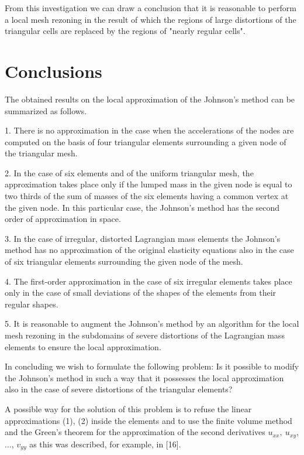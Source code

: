    From this investigation we can draw a conclusion that it is reasonable to
perform a local mesh rezoning in the result of which the regions of large
distortions of the triangular cells are replaced by the regions of "nearly
regular cells".


\section{Conclusions}
\hspace{6mm}
   The obtained results on the local approximation of the Johnson's method
can be summarized as follows.

 1. There is no approximation in the case when the accelerations of the nodes
are computed on the basis of four triangular elements surrounding a given
node of the triangular mesh.

  2. In the case of six elements and of the uniform triangular mesh, the
approximation takes place only if the lumped mass in the given node is equal
to two thirds of the sum of masses of the six elements having a common vertex
at the given node. In this particular case, the Johnson's method has the
second order of approximation in space.

  3. In the case of irregular, distorted Lagrangian mass elements the
Johnson's method has no approximation of the original elasticity equations also
in the case of six triangular elements surrounding the given node of the mesh.

  4. The first-order approximation in the case of six irregular elements takes
place only in the case of small deviations of the shapes of the elements from
their regular shapes.

  5. It is reasonable to augment the Johnson's method by an algorithm for the
local mesh rezoning in the subdomains of severe distortions of the Lagrangian
mass elements to ensure the local approximation.

   In concluding we wish to formulate the following problem: Is it possible to
modify the Johnson's method in such a way that it possesses the local
approximation also in the case of severe distortions of the triangular
elements?

   A possible way for the solution of this problem is to refuse the linear
approximations (1), (2) inside the elements and to use the finite volume method
and the Green's theorem for the approximation of the second derivatives
$u_{xx},~u_{xy}$,$\ldots$, $v_{yy}$ as this was described, for example, in [16].

